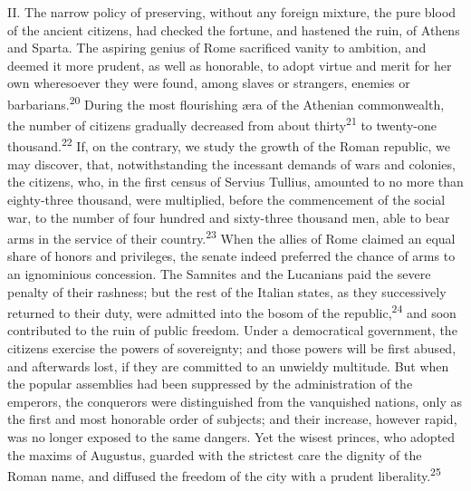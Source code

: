 II. The narrow policy of preserving, without any foreign mixture,
the pure blood of the ancient citizens, had checked the fortune,
and hastened the ruin, of Athens and Sparta. The aspiring genius
of Rome sacrificed vanity to ambition, and deemed it more
prudent, as well as honorable, to adopt virtue and merit for her
own wheresoever they were found, among slaves or strangers,
enemies or barbarians.\textsuperscript{20} During the most flourishing æra of the
Athenian commonwealth, the number of citizens gradually decreased
from about thirty\textsuperscript{21} to twenty-one thousand.\textsuperscript{22} If, on the
contrary, we study the growth of the Roman republic, we may
discover, that, notwithstanding the incessant demands of wars and
colonies, the citizens, who, in the first census of Servius
Tullius, amounted to no more than eighty-three thousand, were
multiplied, before the commencement of the social war, to the
number of four hundred and sixty-three thousand men, able to bear
arms in the service of their country.\textsuperscript{23} When the allies of Rome
claimed an equal share of honors and privileges, the senate
indeed preferred the chance of arms to an ignominious concession.
The Samnites and the Lucanians paid the severe penalty of their
rashness; but the rest of the Italian states, as they
successively returned to their duty, were admitted into the bosom
of the republic,\textsuperscript{24} and soon contributed to the ruin of public
freedom. Under a democratical government, the citizens exercise
the powers of sovereignty; and those powers will be first abused,
and afterwards lost, if they are committed to an unwieldy
multitude. But when the popular assemblies had been suppressed by
the administration of the emperors, the conquerors were
distinguished from the vanquished nations, only as the first and
most honorable order of subjects; and their increase, however
rapid, was no longer exposed to the same dangers. Yet the wisest
princes, who adopted the maxims of Augustus, guarded with the
strictest care the dignity of the Roman name, and diffused the
freedom of the city with a prudent liberality.\textsuperscript{25}


